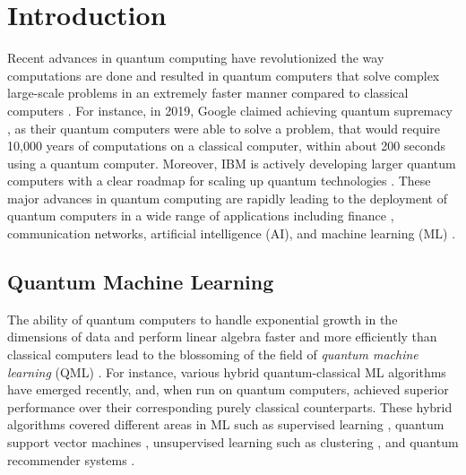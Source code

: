 \documentclass{article}
\begin{document}
\section{Introduction}
\label{introduction}
Recent advances in quantum computing have revolutionized the way computations are done and resulted in quantum computers that solve complex large-scale problems in an extremely faster manner compared to classical computers \cite{nielsen_book}. For instance, in 2019, Google claimed achieving quantum supremacy \cite{quantum_supremacy}, as their quantum computers were able to solve a problem, that would require 10,000 years of computations on a classical computer, within about 200 seconds using a quantum computer. Moreover, IBM is actively developing larger quantum computers \cite{ibm1,ibm_quantum_computer1} with a clear roadmap for scaling up quantum technologies \cite{ibm_quantum_computer1}. These major advances in quantum computing are rapidly leading to the deployment of quantum computers in a wide range of applications including finance \cite{QC_finance}, communication networks, artificial intelligence (AI), and machine learning (ML) \cite{QC_NISQ_era}. 
\subsection{Quantum Machine Learning}
The ability of quantum computers to handle exponential growth in the dimensions of data and perform linear algebra faster and more efficiently than classical computers lead to the blossoming of the field of \emph{quantum machine learning} (QML) \cite{tensorflow_quantum}. For instance, various hybrid quantum-classical ML algorithms have emerged recently, and, when run on quantum computers, achieved superior performance over their corresponding purely classical counterparts. These hybrid algorithms covered different areas in ML such as supervised learning \cite{supervised_QML_book}, quantum support vector machines \cite{quantum_SVM},  unsupervised learning such as clustering \cite{quantum_k_means,NIPS2019_q_means}, and quantum recommender systems \cite{quantum_recommender}. %
\end{document}
